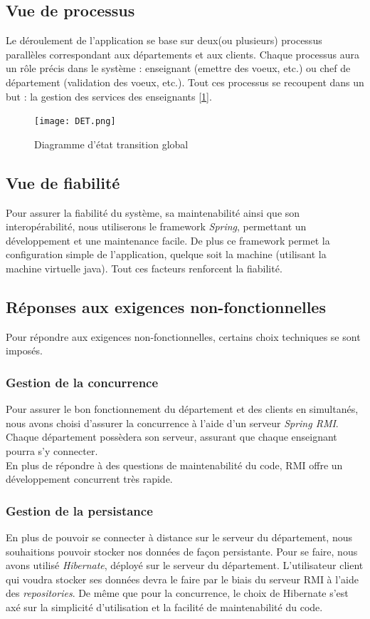 \documentclass[a4paper,11pt]{article}
\newcommand{\br}{\\\mbox{}}
\begin{document}
\subsection{Vue de processus}
Le déroulement de l'application se base sur deux(ou plusieurs) processus parallèles correspondant aux départements et aux clients. Chaque processus aura un rôle précis dans le système : enseignant (emettre des voeux, etc.) ou chef de département (validation des voeux, etc.). Tout ces processus se recoupent dans un but : la gestion des services des enseignants [\ref{Det}].
\begin{figure}
\centering
\texttt{[image: DET.png]}
\caption{Diagramme d'état transition global}
\label{Det}
\end{figure}
\subsection{Vue de fiabilité}
Pour assurer la fiabilité du système, sa maintenabilité ainsi que son interopérabilité, nous utiliserons le framework \textit{Spring}, permettant un développement et une maintenance facile. De plus ce framework permet la configuration simple de l'application, quelque soit la machine (utilisant la machine virtuelle java). Tout ces facteurs renforcent la fiabilité.
\subsection{Réponses aux exigences non-fonctionnelles}
Pour répondre aux exigences non-fonctionnelles, certains choix techniques se sont imposés.
\subsubsection{Gestion de la concurrence}
Pour assurer le bon fonctionnement du département et des clients en simultanés, nous avons choisi d'assurer la concurrence à l'aide d'un serveur \textit{Spring RMI}. Chaque département possèdera son serveur, assurant que chaque enseignant pourra s'y connecter.\br
En plus de répondre à des questions de maintenabilité du code, RMI offre un développement concurrent très rapide.
\subsubsection{Gestion de la persistance}
En plus de pouvoir se connecter à distance sur le serveur du département, nous souhaitions pouvoir stocker nos données de façon persistante. Pour se faire, nous avons utilisé \textit{Hibernate}, déployé sur le serveur du département. L'utilisateur client qui voudra stocker ses données devra le faire par le biais du serveur RMI à l'aide des \textit{repositories}. De même que pour la concurrence, le choix de Hibernate s'est axé sur la simplicité d'utilisation et la facilité de maintenabilité du code.
\end{document}
